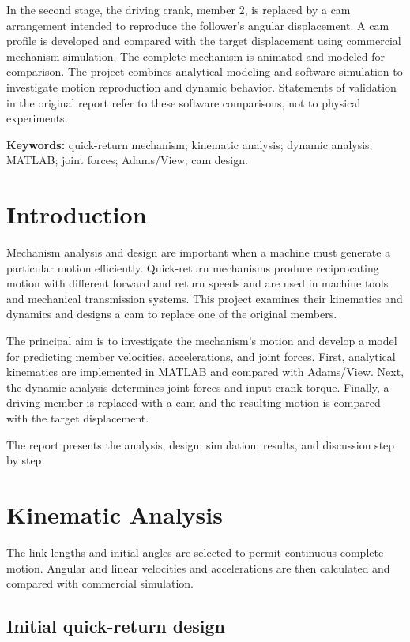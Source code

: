 \documentclass[11pt,a4paper]{article}
\begin{document}
In the second stage, the driving crank, member 2, is replaced by a cam arrangement intended to reproduce the follower's angular displacement. A cam profile is developed and compared with the target displacement using commercial mechanism simulation. The complete mechanism is animated and modeled for comparison. The project combines analytical modeling and software simulation to investigate motion reproduction and dynamic behavior. Statements of validation in the original report refer to these software comparisons, not to physical experiments.

\textbf{Keywords:} quick-return mechanism; kinematic analysis; dynamic analysis; MATLAB; joint forces; Adams/View; cam design.

\section{Introduction}

Mechanism analysis and design are important when a machine must generate a particular motion efficiently. Quick-return mechanisms produce reciprocating motion with different forward and return speeds and are used in machine tools and mechanical transmission systems. This project examines their kinematics and dynamics and designs a cam to replace one of the original members.

The principal aim is to investigate the mechanism's motion and develop a model for predicting member velocities, accelerations, and joint forces. First, analytical kinematics are implemented in MATLAB and compared with Adams/View. Next, the dynamic analysis determines joint forces and input-crank torque. Finally, a driving member is replaced with a cam and the resulting motion is compared with the target displacement.

The report presents the analysis, design, simulation, results, and discussion step by step.

\section{Kinematic Analysis}

The link lengths and initial angles are selected to permit continuous complete motion. Angular and linear velocities and accelerations are then calculated and compared with commercial simulation.

\subsection{Initial quick-return design}
\end{document}
